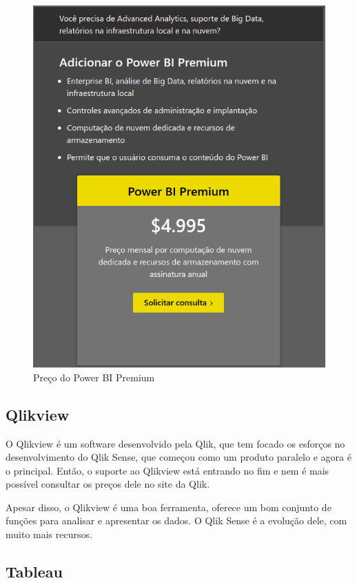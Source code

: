 \begin{figure}[h]
	\centering
	\includegraphics[scale=0.40]{./figures/cap1/powerbi.png}
	\caption{Preço do Power BI Premium}
\end{figure}

\subsection{Qlikview}

O Qlikview é um software desenvolvido pela Qlik, que tem focado os esforços no desenvolvimento do Qlik Sense, que começou como um produto paralelo e agora é o principal. Então, o suporte ao Qlikview está entrando no fim e nem é mais possível consultar os preços dele no site da Qlik. 

Apesar disso, o Qlikview é uma boa ferramenta, oferece um bom conjunto de funções para analisar e apresentar os dados. O Qlik Sense é a evolução dele, com muito mais recursos.

\subsection{Tableau}

